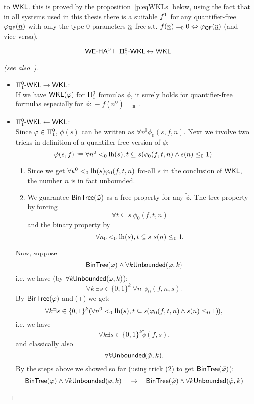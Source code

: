 to $\textsf{\upshape WKL}$. this is proved by the proposition~\ref{p:eqWKLs} below, using the fact 
that in all systems used in this thesis there is
a suitable $f^\mathbf{1}$ for any quantifier-free $\varphi_{\textsf{\upshape QF}}(\underline n)$ with only the type $0$ parameters $\underline n$ free 
s.t. $f(\underline n)=_00\Leftrightarrow\varphi_{\textsf{\upshape QF}}(\underline n)$ (and vice-versa).
\begin{prop}\label{p:eqWKLs}
\[{\textsf{\upshape WE-HA}}^{\omega}\vdash\Pi^0_1\textsf{\upshape -}\textsf{\upshape WKL}\leftrightarrow\textsf{\upshape WKL}\]
\end{prop}
%
%
\begin{proof}[ (see also~\cite{Simpson99})]
\begin{itemize}
\item $\Pi^0_1\textsf{\upshape -}\textsf{\upshape WKL}\rightarrow\textsf{\upshape WKL}$:\\
If we have  $\textsf{\upshape WKL}(\varphi)$ for $\Pi^0_1$ formulas $\phi$, it surely holds for quantifier-free formulas
especially for $\phi:\equiv f(n^0)=_00$.
\item $\Pi^0_1\textsf{\upshape -}\textsf{\upshape WKL}\leftarrow\textsf{\upshape WKL}$:\\
Since $\varphi\in\Pi^0_1$, $\phi(s)$ can be written as $\forall n^0\phi_0(s,f,n)$. 
Next we involve two tricks in definition of a quantifier-free version of $\phi$:
\[
\tilde{\varphi}(s,f):\equiv 
  \forall n^0<_0 \operatorname{lh}(s),t\subseteq s(\varphi_0(f,t,n)\wedge s(n)\leq_01)
\text{.}
\]
\begin{enumerate}
\item Since we get $\forall n^0<_0 \operatorname{lh}(s) \varphi_0(f,t,n)$ for-all $s$ 
in the conclusion of $\textsf{\upshape WKL}$, the number $n$ is in fact unbounded.
\item We guarantee $\textsf{\upshape BinTree}(\tilde{\varphi})$ as a free property for any $\tilde\phi$. 
The tree property by forcing 
\[\forall t\subseteq s\ \phi_0(f,t,n)\]
and the binary property by 
\[\forall n_0<_0 \lh(s),t\subseteq\nolinebreak s\  s(n)\leq_0\nolinebreak 1\text{.} \]
\end{enumerate}
Now, suppose
\[ \textsf{\upshape BinTree}(\varphi) \wedge \forall k \textsf{\upshape Unbounded}(\varphi,k) \] 
i.e. we have (by $\forall k \textsf{\upshape Unbounded}(\varphi,k)$):
\[
  \forall k\ \exists s\in\{0,1\}^{k}\ \forall n\ \ \phi_0(f,n,s)\text{.}\tag{+}
\]
By $\textsf{\upshape BinTree}(\varphi)$ and (+) we get:
\[
  \forall k \exists s\in\{0,1\}^{k} 
     (\forall n^0<_0 \operatorname{lh}(s),t\subseteq s(\varphi_0(f,t,n)\wedge s(n)\leq_01))\text{,}
\]
i.e. we have
\[
  \forall k \exists s\in\{0,1\}^{k} \tilde\phi(f,s)\text{,}
\]
and classically also
\[
  \forall k \textsf{\upshape Unbounded}(\tilde{\varphi},k)\text{.}
\]
By the steps above we showed so far (using trick (2) to get $\textsf{\upshape BinTree}(\tilde{\varphi})$):
\[ 
\textsf{\upshape BinTree}(\varphi) \wedge \forall k \textsf{\upshape Unbounded}(\varphi,k) 
  \quad\rightarrow\quad \textsf{\upshape BinTree}(\tilde{\varphi}) \wedge \forall k \textsf{\upshape Unbounded}(\tilde{\varphi},k) 
\]
\end{itemize}
\end{proof}
